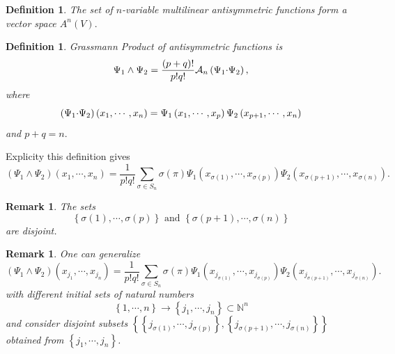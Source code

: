 \documentclass[aps,preprint]{revtex4}%
\newtheorem{definition}[theorem]{Definition}
\newtheorem{remark}[theorem]{Remark}
\begin{document}
\begin{definition}
The set of $n$-variable multilinear antisymmetric functions form a vector
space $A^{n}\left(  V\right)  .$
\end{definition}

\begin{definition}
Grassmann Product of antisymmetric functions is
\begin{equation}
\Psi_{1}\wedge\Psi_{2}=\frac{\left(  p+q\right)  !}{p!q!}\mathcal{A}%
_{n}\left(  \Psi_{1}{\small \cdot}\Psi_{2}\right)  ,
\end{equation}
where
\begin{equation}
\left(  \Psi_{1}{\small \cdot}\Psi_{2}\right)  \left(  x_{1},\cdots
,x_{n}\right)  =\Psi_{1}\left(  x_{1},\cdots,x_{p}\right)  \Psi_{2}\left(
x_{p+1},\cdots,x_{n}\right)
\end{equation}
and $p+q=n.$
\end{definition}

Explicity this definition gives%
\begin{equation}
\left(  \Psi_{1}\wedge\Psi_{2}\right)  \left(  x_{1},\cdots,x_{n}\right)
=\frac{1}{p!q!}\sum_{\sigma\in S_{n}}\sigma\left(  \pi\right)  \Psi_{1}\left(
x_{\sigma\left(  1\right)  },\cdots,x_{\sigma\left(  p\right)  }\right)
\Psi_{2}\left(  x_{\sigma\left(  p+1\right)  },\cdots,x_{\sigma\left(
n\right)  }\right)  .
\end{equation}


\begin{remark}
The sets
\begin{equation}
\left\{  \sigma\left(  1\right)  ,\cdots,\sigma\left(  p\right)  \right\}
\text{ and }\left\{  \sigma\left(  p+1\right)  ,\cdots,\sigma\left(  n\right)
\right\}
\end{equation}
are disjoint.
\end{remark}

\begin{remark}
One can generalize
\begin{equation}
\left(  \Psi_{1}\wedge\Psi_{2}\right)  \left(  x_{j_{1}},\cdots,x_{j_{n}%
}\right)  =\frac{1}{p!q!}\sum_{\sigma\in S_{n}}\sigma\left(  \pi\right)
\Psi_{1}\left(  x_{j_{\sigma\left(  1\right)  }},\cdots,x_{j_{\sigma\left(
p\right)  }}\right)  \Psi_{2}\left(  x_{j_{\sigma\left(  p+1\right)  }}%
,\cdots,x_{j_{\sigma\left(  n\right)  }}\right)  .
\end{equation}
with different initial sets of natural numbers
\begin{equation}
\left\{  1,\cdots,n\right\}  \rightarrow\left\{  j_{1},\cdots,j_{n}\right\}
\subset\mathbb{N}^{n}%
\end{equation}
and consider disjoint subsets $\left\{  \left\{  j_{\sigma\left(  1\right)
},\cdots,j_{\sigma\left(  p\right)  }\right\}  ,\left\{  j_{\sigma\left(
p+1\right)  },\cdots,j_{\sigma\left(  n\right)  }\right\}  \right\}  $
obtained from $\left\{  j_{1},\cdots,j_{n}\right\}  $.
\end{remark}
\end{document}
